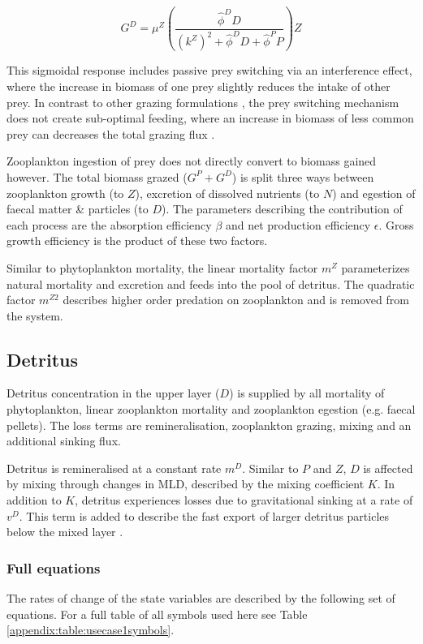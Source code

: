 \documentclass[template.tex]{subfiles}
\begin{document}
\begin{equation}
    G^D = \mu^Z \left( \frac{ \hat{\phi}^D D}{(k^Z)^2 + \hat{\phi}^D D +\hat{\phi}^P P}  \right) Z
\end{equation}

This sigmoidal response includes passive prey switching via an interference effect, where the increase in biomass of one prey slightly reduces the intake of other prey. In contrast to other grazing formulations \citep[e.g.][]{Fasham1990a}, the prey switching mechanism does not create sub-optimal feeding, where an increase in biomass of less common prey can decreases the total grazing flux \citep{Gentleman2003a}.

Zooplankton ingestion of prey does not directly convert to biomass gained however. The total biomass grazed ($G^P + G^D$) is split three ways between zooplankton growth (to $Z$), excretion of dissolved nutrients (to $N$) and egestion of faecal matter \& particles (to $D$). The parameters describing the contribution of each process are the absorption efficiency $\beta$ and net production efficiency $\epsilon$. Gross growth efficiency is the product of these two factors.  

Similar to phytoplankton mortality, the linear mortality factor $m^Z$ parameterizes natural mortality and excretion and feeds into the pool of detritus. The quadratic factor $m^{Z2}$ describes higher order predation on zooplankton and is removed from the system.

\subsection{Detritus}
Detritus concentration in the upper layer ($D$) is supplied by all mortality of phytoplankton, linear zooplankton mortality and zooplankton egestion (e.g. faecal pellets). The loss terms are remineralisation, zooplankton grazing, mixing and an additional sinking flux. 

Detritus is remineralised at a constant rate $m^D$. Similar to $P$ and $Z$, $D$ is affected by mixing through changes in MLD, described by the mixing coefficient $K$. In addition to $K$, detritus experiences losses due to gravitational sinking at a rate of $v^D$. This term is added to describe the fast export of larger detritus particles below the mixed layer \citep{Anderson2015c}.

\subsubsection{Full equations}
The rates of change of the state variables are described by the following set of equations. For a full table of all symbols used here see Table \ref{appendix:table:usecase1symbols}.
\end{document}
